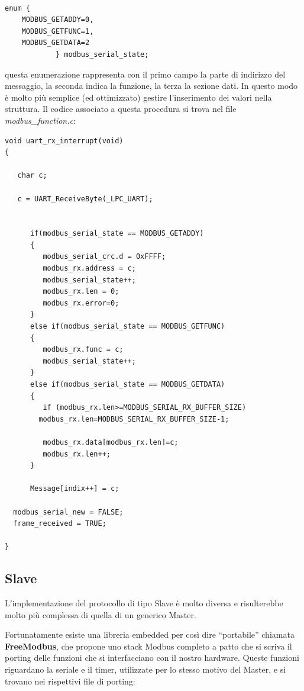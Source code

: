\documentclass[a4paper,titlepage]{book}
\begin{document}
\begin{lstlisting}[showlines=false]

enum {
	MODBUS_GETADDY=0, 
	MODBUS_GETFUNC=1, 
	MODBUS_GETDATA=2 
			} modbus_serial_state;

\end{lstlisting}

questa enumerazione rappresenta con il primo campo la parte di indirizzo del messaggio, la seconda indica la funzione, la terza la sezione dati. In questo modo è molto più semplice (ed ottimizzato) gestire l'inserimento dei valori nella struttura.
\newpage
Il codice associato a questa procedura si trova nel file \textit{modbus\_function.c}:

\begin{lstlisting}[showlines=true, firstnumber=202]
void uart_rx_interrupt(void)
{

   char c;

   c = UART_ReceiveByte(_LPC_UART);


      if(modbus_serial_state == MODBUS_GETADDY)
      {
         modbus_serial_crc.d = 0xFFFF;
         modbus_rx.address = c;
         modbus_serial_state++;
         modbus_rx.len = 0;
         modbus_rx.error=0;
      }
      else if(modbus_serial_state == MODBUS_GETFUNC)
      {
         modbus_rx.func = c;
         modbus_serial_state++;
      }
      else if(modbus_serial_state == MODBUS_GETDATA)
      {
         if (modbus_rx.len>=MODBUS_SERIAL_RX_BUFFER_SIZE) 
		modbus_rx.len=MODBUS_SERIAL_RX_BUFFER_SIZE-1;

         modbus_rx.data[modbus_rx.len]=c;
         modbus_rx.len++;
      }

      Message[indix++] = c;

  modbus_serial_new = FALSE;
  frame_received = TRUE;

}
\end{lstlisting}

\subsection{Slave}

L'implementazione del protocollo di tipo Slave è molto diversa e risulterebbe molto più complessa di quella di un generico Master.

Fortunatamente esiste una libreria embedded per così dire ``portabile'' chiamata \textbf{FreeModbus}, che propone uno stack Modbus completo a patto che si scriva il porting delle funzioni che si interfacciano con il nostro hardware. Queste funzioni riguardano la seriale e il timer, utilizzate per lo stesso motivo del Master, e si trovano nei rispettivi file di porting:
\end{document}

